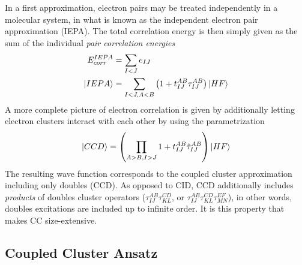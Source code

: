 In a first approximation, electron pairs may be treated independently in a molecular system, in what is known as the independent electron pair approximation (IEPA). The total correlation energy is then simply given as the sum of the individual \emph{pair correlation energies}
\begin{align}
E_{corr}^{IEPA} &= \sum_{I < J} e_{IJ}  \\
\ket{IEPA} &= \sum_{I < J, A < B} \left(1 + t_{IJ}^{AB}\mathbf{\tau}_{IJ}^{AB} \right) \ket{HF} 
\end{align}
\noindent A more complete picture of electron correlation is given by additionally letting electron clusters interact with each other by using the parametrization
\begin{equation}
\ket{CCD} = \left( \prod_{A > B,I > J} 1 + t_{IJ}^{AB}\hat{\tau}_{IJ}^{AB} \right) \ket{HF}
\end{equation}
\noindent The resulting wave function corresponds to the coupled cluster approximation including only doubles (CCD). As opposed to CID, CCD additionally includes \emph{products} of doubles cluster operators ($\tau_{IJ}^{AB} \tau_{KL}^{CD}$, or $\tau_{IJ}^{AB} \tau_{KL}^{CD} \tau_{MN}^{EF}$), in other words, doubles excitations are included up to infinite order. It is this property that makes CC size-extensive.


\subsection{Coupled Cluster Ansatz}

